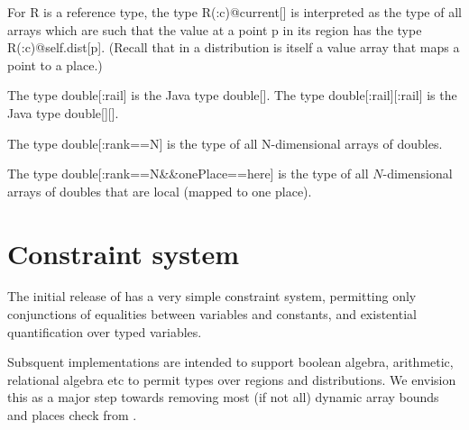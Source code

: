 For {\cf R} is a reference type, the type {\cf R(:c)@current[]} is interpreted as the
type of all arrays which are such that the value at a point {\cf p} in its
region has the type {\cf R(:c)@self.dist[p]}. (Recall that in \Xten{} a
distribution is itself a value array that maps a point to a place.)

\begin{example}
  The type {\cf double[:rail]} is the Java type {\cf double[]}.
  The type {\cf double[:rail][:rail]} is the Java type {\cf double[][]}.

  The type {\cf double[:rank==N]} is the type of all N-dimensional arrays of
  doubles.

  The type {\cf double[:rank==N\&\&onePlace==here]} is the type of all $N$-dimensional
  arrays of doubles that are local (mapped to one place).  
\end{example}

\section{Constraint system}

The initial release of \Xten{} has a very simple constraint system,
permitting only conjunctions of equalities between variables and
constants, and existential quantification over typed variables.

Subsquent implementations are intended to support boolean algebra,
arithmetic, relational algebra etc to permit types over regions and
distributions. We envision this as a major step towards removing most
(if not all) dynamic array bounds and places check from \Xten{}.
  

